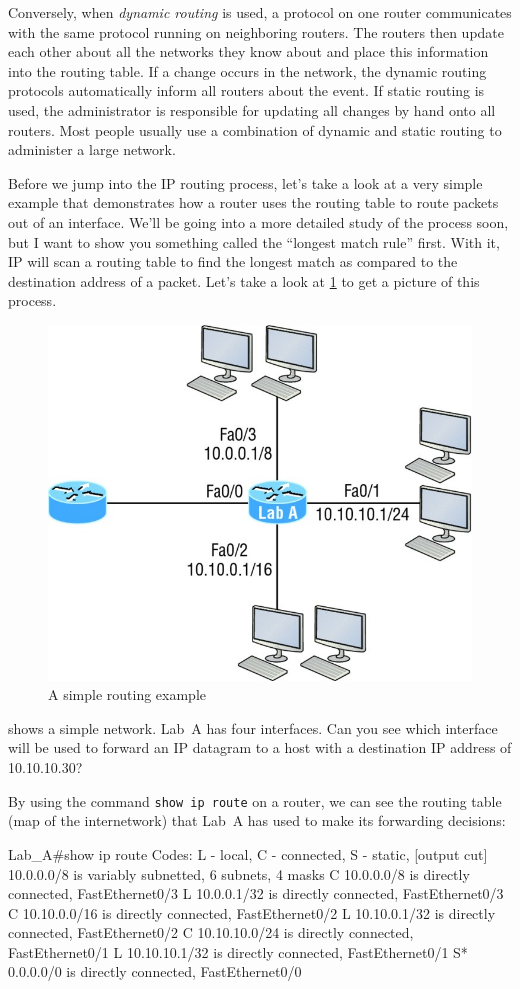 Conversely, when \emph{dynamic routing} is used, a protocol on one
router communicates with the same protocol running on neighboring
routers. The routers then update each other about all the networks they
know about and place this information into the routing table. If a
change occurs in the network, the dynamic routing protocols
automatically inform all routers about the event. If static routing is
used, the administrator is responsible for updating all changes by hand
onto all routers. Most people usually use a combination of dynamic and
static routing to administer a large network.

Before we jump into the IP routing process, let's take a look at a very
simple example that demonstrates how a router uses the routing table to
route packets out of an interface. We'll be going into a more detailed
study of the process soon, but I want to show you something called the
``longest match rule'' first. With it, IP will scan a routing table to
find the longest match as compared to the destination address of a packet.
Let's take a look at \cref{fig:simple-routing-example} to get a picture of this process.


\begin{figure}
   \centering
   \includegraphics[width=.5\textwidth]{images/c09f001.jpg}
   \caption{A simple routing example}
   \label{fig:simple-routing-example}
\end{figure}


 shows a simple network.
Lab~A has four interfaces.
Can you see which interface will be used to forward an IP datagram to a host with a destination IP address of 10.10.10.30?

By using the command \texttt{show\ ip\ route} on a router, we can see
the routing table (map of the internetwork) that Lab~A has used to make
its forwarding decisions:

\begin{cli}
Lab_A#show ip route
Codes: L - local, C - connected, S - static,
[output cut]
        10.0.0.0/8 is variably subnetted, 6 subnets, 4 masks
C       10.0.0.0/8 is directly connected, FastEthernet0/3
L       10.0.0.1/32 is directly connected, FastEthernet0/3
C       10.10.0.0/16 is directly connected, FastEthernet0/2
L       10.10.0.1/32 is directly connected, FastEthernet0/2
C       10.10.10.0/24 is directly connected, FastEthernet0/1
L       10.10.10.1/32 is directly connected, FastEthernet0/1
S*      0.0.0.0/0 is directly connected, FastEthernet0/0
\end{cli}

